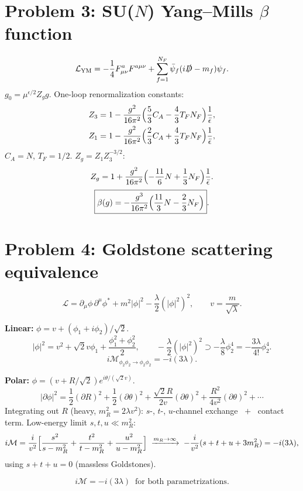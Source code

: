 \documentclass{article}
\begin{document}
\section*{Problem 3: SU($N$) Yang--Mills $\beta$ function}

\begin{equation}
\mathcal{L}_{\rm YM} = -\frac14 F_{\mu\nu}^a F^{a\mu\nu} + \sum_{f=1}^{N_F}\bar\psi_f(i\slashed D-m_f)\psi_f.
\end{equation}
$g_0=\mu^{\epsilon/2}Z_g g$. One-loop renormalization constants:
\begin{align}
Z_3 &= 1 - \frac{g^2}{16\pi^2}\Bigl(\frac53 C_A - \frac43 T_F N_F\Bigr)\frac1{\bar\epsilon},\\
Z_1 &= 1 - \frac{g^2}{16\pi^2}\Bigl(\frac23 C_A + \frac43 T_F N_F\Bigr)\frac1{\bar\epsilon},
\end{align}
$C_A=N$, $T_F=1/2$. $Z_g=Z_1 Z_3^{-3/2}$:
\begin{equation}
Z_g = 1 + \frac{g^2}{16\pi^2}\Bigl(-\frac{11}{6}N + \frac13 N_F\Bigr)\frac1{\bar\epsilon}.
\end{equation}
\begin{equation}
\boxed{\beta(g) = -\frac{g^3}{16\pi^2}\Bigl(\frac{11}{3}N - \frac23 N_F\Bigr)}.
\end{equation}

\section*{Problem 4: Goldstone scattering equivalence}

\begin{equation}
\mathcal{L} = \partial_\mu\phi\,\partial^\mu\phi^* + m^2|\phi|^2 - \frac{\lambda}{2}(|\phi|^2)^2,\qquad v = \frac{m}{\sqrt{\lambda}}.
\end{equation}

\noindent\textbf{Linear:} $\phi = v + (\phi_1+i\phi_2)/\sqrt{2}$.
\begin{equation}
|\phi|^2 = v^2 + \sqrt{2}v\phi_1 + \frac{\phi_1^2+\phi_2^2}{2},\qquad
-\frac{\lambda}{2}(|\phi|^2)^2 \supset -\frac{\lambda}{8}\phi_2^4 = -\frac{3\lambda}{4!}\phi_2^4.
\end{equation}
\begin{equation}
i\mathcal{M}_{\phi_2\phi_2\to\phi_2\phi_2} = -i(3\lambda).
\end{equation}

\noindent\textbf{Polar:} $\phi = (v+R/\sqrt{2})e^{i\theta/(\sqrt{2}v)}$.
\begin{equation}
|\partial\phi|^2 = \frac12(\partial R)^2 + \frac12(\partial\theta)^2 + \frac{\sqrt{2}R}{2v}(\partial\theta)^2 + \frac{R^2}{4v^2}(\partial\theta)^2 + \cdots
\end{equation}
Integrating out $R$ (heavy, $m_R^2 = 2\lambda v^2$): $s$-, $t$-, $u$-channel exchange $\;+\;$ contact term. Low-energy limit $s,t,u\ll m_R^2$:
\begin{equation}
i\mathcal{M} = \frac{i}{v^2}\Bigl[\frac{s^2}{s-m_R^2}+\frac{t^2}{t-m_R^2}+\frac{u^2}{u-m_R^2}\Bigr]
\;\xrightarrow{m_R\to\infty}\; -\frac{i}{v^2}(s+t+u + 3m_R^2) = -i(3\lambda),
\end{equation}
using $s+t+u=0$ (massless Goldstones).

\begin{equation}
\boxed{i\mathcal{M} = -i(3\lambda)\;\;\text{for both parametrizations}.}
\end{equation}
\end{document}
